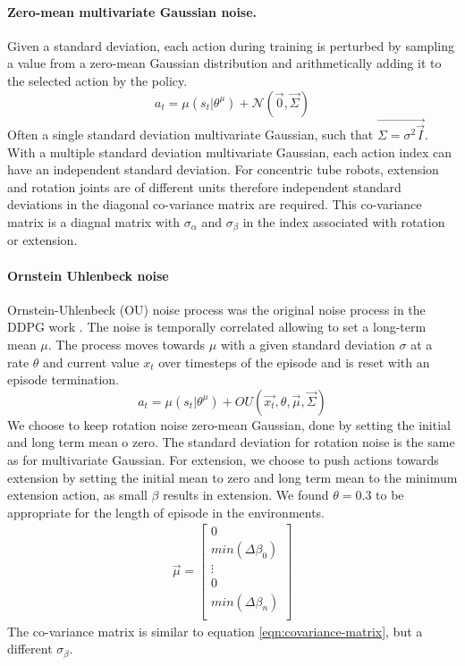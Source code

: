 \paragraph{Zero-mean multivariate Gaussian noise.}
Given a standard deviation, each action during training is perturbed by sampling a value from a zero-mean Gaussian distribution and arithmetically adding it to the selected action by the policy.
\begin{equation}
    a_t = \mu(s_t | \theta^\mu) + \mathcal{N} (\Vec{0}, \Vec{\Sigma}) \label{eqn:action-multivariate-gaussian}
\end{equation}
Often a single standard deviation multivariate Gaussian, such that $\Vec{\Sigma = \sigma^2 \Vec{I}}$.  With a multiple standard deviation multivariate Gaussian, each action index can have an independent standard deviation. For concentric tube robots, extension and rotation joints are of different units therefore independent standard deviations in the diagonal co-variance matrix are required. This co-variance matrix is a diagnal matrix with $\sigma_\alpha$ and $\sigma_\beta$ in the index associated with rotation or extension.

\paragraph{Ornstein Uhlenbeck noise}
Ornstein-Uhlenbeck (OU) noise process was the original noise process in the DDPG work  \cite{Lillicrap2015}. The noise is temporally correlated allowing to set a long-term mean $\mu$. The process moves towards $\mu$ with a given standard deviation $\sigma$ at a rate $\theta$ and current value $x_t$ over timesteps of the episode and is reset with an episode termination.
\begin{equation}
    a_t = \mu(s_t | \theta^\mu) + OU \left( \Vec{x_{t}}, \theta, \Vec{\mu}, \Vec{\Sigma} \right) \label{eqn:action-ou}
\end{equation}
We choose to keep rotation noise zero-mean Gaussian, done by setting the initial and long term mean o zero. The standard deviation for rotation noise is the same as for multivariate Gaussian. For extension, we choose to push actions towards extension by setting the initial mean to zero and long term mean to the minimum extension action, as small $\beta$ results in extension. We found $\theta=0.3$ to be appropriate for the length of episode in the environments.
\begin{equation}
\begin{aligned}
\Vec{\mu} =
\left [
\begin{matrix}
0 \\
min(\Delta \beta_0) \\
\vdots \\
0 \\
min(\Delta \beta_n) \\
\end{matrix}
\right ]
\end{aligned} \label{eqn:mean-ou}
\end{equation}
The co-variance matrix is similar to equation \ref{eqn:covariance-matrix}, but a different $\sigma_\beta$.

